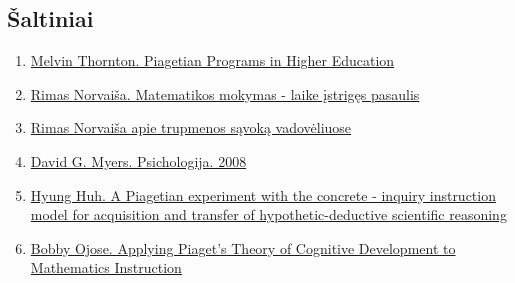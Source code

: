 \documentclass{article}
\begin{document}
\subsection{Šaltiniai}
\begin{enumerate}
\item \href{http://digitalcommons.unl.edu/cgi/viewcontent.cgi?article=1013\&context=adaptessays}{Melvin Thornton. Piagetian Programs in Higher Education}

\item \href{norvaisa.lt/wp-content/uploads/2012/07/laike-istriges-pasaulis.pdf}{Rimas Norvaiša. Matematikos mokymas - laike įstrigęs pasaulis}

\item \href{http://norvaisa.lt/matematika/mokykline-matematika/mokyklines-matematikos-turinys-trupmenos-savoka/} { Rimas Norvaiša apie trupmenos sąvoką vadovėliuose}

\item \href{https://www.dropbox.com/s/vyghsx7k1ivd86g/David\%20G.\%20Myers\%20Psichologija\%202008.pdf?dl=0}{David G. Myers. Psichologija. 2008}

\item \href{https://pdfs.semanticscholar.org/3fbd/493c9bfa3d5a96bc2f82f8677b1de5b35b40.pdf\_ga=2.93207450.649401276.1573859970-917910527.1573859970}{Hyung Huh. A Piagetian experiment with the concrete - inquiry instruction model for acquisition and transfer of hypothetic-deductive scientific reasoning}

\item \href{https://files.eric.ed.gov/fulltext/EJ841568.pdf}{Bobby Ojose. Applying Piaget's Theory of Cognitive Development to Mathematics Instruction}
\end{enumerate}
\end{document}
